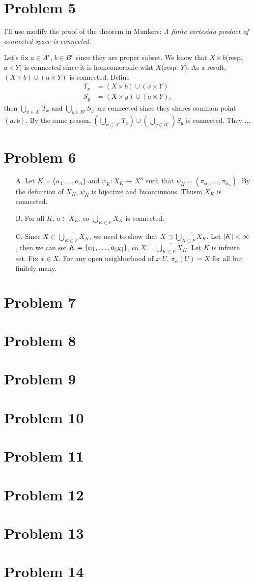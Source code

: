 \documentclass{article}
\DeclarePairedDelimiter\abs{\lvert}{\rvert}%
\begin{document}
\section*{Problem 5}
I'll use modify the proof of the theorem in Munkers: \textit{A finite cartesian product of connected space is connected.}

Let's fix $a\in A^c$, $b\in B^c$ since they are proper subset. We know that $X\times b$(resp. $a\times Y$) is connected since it is homeomorphic wiht $X$(resp. $Y$). As a result, $(X\times b) \cup (a\times Y)$ is connected. Define
\begin{equation*}
\begin{split}
T_x&=(X\times b)\cup (x\times Y) \\
S_y&=(X\times y)\cup (a\times Y),
\end{split}
\end{equation*}
then $\bigcup_{x\in A^c} T_x$ and $\bigcup_{y\in B^c} S_y$ are connected since they shares common point $(a,b)$. By the same reason, $\left(\bigcup_{x\in A^c} T_x\right) \cup \left(\bigcup_{y\in B^c}\right)S_y$ is connected. They ...
\section*{Problem 6}
\begin{enumerate}
\item[A.] Let $K=\{\alpha_1, \ldots, \alpha_n\}$ and $\psi_K:X_K\rightarrow X^{n}$ such that $\psi_K=(\pi_{\alpha_1}, \ldots, \pi_{\alpha_n})$. By the definition of $X_K$, $\psi_K$ is bijective and bicontinuous. Thusm $X_K$ is connected.
\item[B.] For all $K$, $a\in X_K$, so $\bigcup_{K\in F}X_K$ is connected.
\item[C.] Since $X\subset\overline{\bigcup_{K\in F}X_K}$, we need to show that $X\supset \overline{\bigcup_{K\in F}X_K}$. Let $\abs{K}<\infty$, then we can set $K=\{\alpha_1, \ldots, \alpha_{\abs{K}}\}$, so $X=\overline{\bigcup_{K\in F}X_K}$. Let $K$ is infinite set. Fix $x\in X$. For any open neighborhood of $x$ $U$, $\pi_{\alpha}(U)=X$ for all but finitely many. 
\end{enumerate}
\section*{Problem 7}
\section*{Problem 8}
\section*{Problem 9}
\section*{Problem 10}
\section*{Problem 11}
\section*{Problem 12}
\section*{Problem 13}
\section*{Problem 14}
\end{document}

